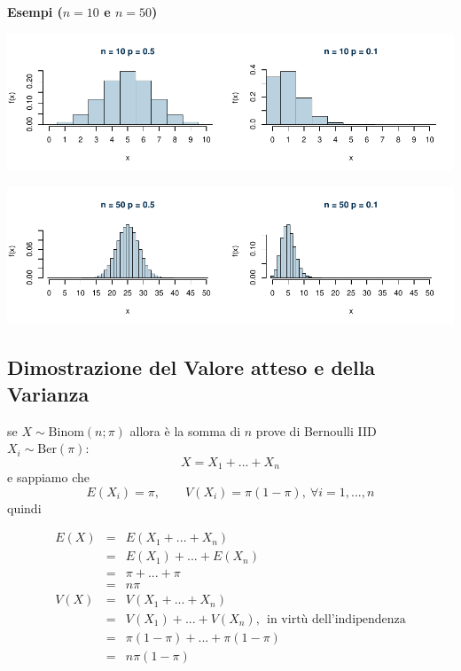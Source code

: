 \documentclass[
  11pt,
]{book}
\theoremstyle{mytheoremstyle}
\theoremstyle{mydefstyle}
\begin{document}
\textbf{Esempi (\(n=10\) e \(n=50\))}

\begin{center}\includegraphics{Appunti_di_Statistica_2025_files/figure-latex/07a-Binomiale-3-1} \end{center}

\begin{center}\includegraphics{Appunti_di_Statistica_2025_files/figure-latex/07a-Binomiale-4-1} \end{center}

\subsection{Dimostrazione del Valore atteso e della Varianza}\label{dimostrazione-del-valore-atteso-e-della-varianza}

se \(X\sim\text{Binom}(n;\pi)\) allora è la somma di \(n\) prove di Bernoulli IID
\(X_i\sim\text{Ber}(\pi)\):
\[X=X_1+...+X_n\]
e sappiamo che
\[E(X_i)=\pi,\qquad V(X_i)=\pi(1-\pi),~\forall i=1,...,n\]
quindi

\begin{eqnarray*}
E(X) &=& E(X_1+...+X_n)\\
     &=& E(X_1)+...+E(X_n)\\
     &=& \pi +...+\pi\\
     &=& n\pi \\
V(X) &=& V(X_1+...+X_n)\\
&=& V(X_1)+...+V(X_n),~~\text{in virtù dell'indipendenza}\\
     &=& \pi(1-\pi) +...+\pi(1-\pi)\\
     &=& n\pi(1-\pi) 
\end{eqnarray*}
\end{document}
